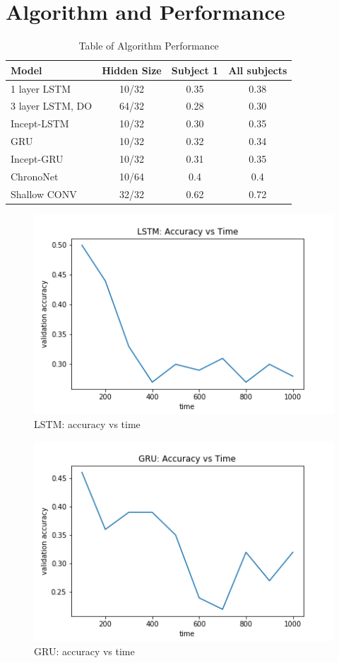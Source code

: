 \documentclass[10pt,twocolumn,letterpaper]{article}
\begin{document}
 \clearpage
\newpage
\clearpage
\newpage
\clearpage
\newpage
\section{Algorithm and Performance}
\begin{table}[h]
  \centering
  \begin{tabular}{lccc}
    \hline
    Model & Hidden Size & Subject 1 & All subjects\\
    \hline
    1 layer LSTM & 10/32 & 0.35 & 0.38\\
    3 layer LSTM, DO & 64/32 & 0.28 & 0.30\\
    Incept-LSTM & 10/32 & 0.30 & 0.35\\
    GRU & 10/32 & 0.32 & 0.34\\
    Incept-GRU & 10/32 & 0.31 & 0.35 \\
    ChronoNet & 10/64 & 0.4 & 0.4\\
    Shallow CONV & 32/32 & 0.62 & 0.72\\
    \hline
  \end{tabular}
  \caption{Table of Algorithm Performance}\label{tab:algo}
\end{table}

\begin{figure}[h]
  \centering
  \includegraphics[scale=0.5]{t_LSTM}
  \caption{LSTM: accuracy vs time}
  \label{fig:lstm_acc}
\end{figure}

\begin{figure}[h]
  \centering
  \includegraphics[scale=0.5]{t_GRU}
  \caption{GRU: accuracy vs time}
  \label{fig:gru_acc}
\end{figure}
\newpage
\end{document}
